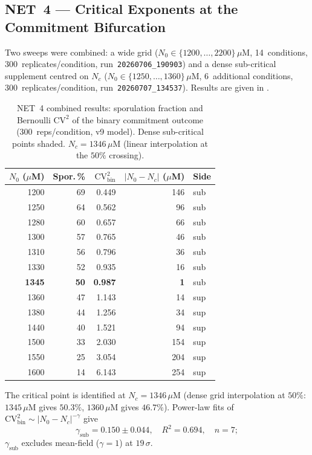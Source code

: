 \documentclass[11pt,a4paper]{article}
\newcommand{\CV}{\mathrm{CV}}
\begin{document}
\subsection{NET~4 --- Critical Exponents at the Commitment Bifurcation}
\label{ssec:t4}

Two sweeps were combined: a wide grid ($N_0 \in \{1200,\ldots,2200\}\,\mu$M,
14~conditions, 300~replicates/condition, run~\texttt{20260706\_190903}) and a
dense sub-critical supplement centred on $N_c$ ($N_0 \in \{1250,\ldots,1360\}\,
\mu$M, 6~additional conditions, 300~replicates/condition,
run~\texttt{20260707\_134537}).
Results are given in .

\begin{table}[h]
\centering
\caption{NET~4 combined results: sporulation fraction and Bernoulli $\CV^2$ of the
binary commitment outcome (300~reps/condition, v9 model).
Dense sub-critical points shaded.  $N_c = 1346\,\mu$M (linear interpolation at
the $50\%$ crossing).}
\label{tab:t4}
{\small\begin{tabular}{rrrrl}
\toprule
$N_0$ ($\mu$M) & Spor.\,\% & $\CV^2_{\mathrm{bin}}$ & $|N_0-N_c|$ ($\mu$M) & Side \\
\midrule
1200 & 69 & 0.449 & 146 & sub \\
\rowcolor{gray!15} 1250 & 64 & 0.562 &  96 & sub \\
\rowcolor{gray!15} 1280 & 60 & 0.657 &  66 & sub \\
1300 & 57 & 0.765 &  46 & sub \\
\rowcolor{gray!15} 1310 & 56 & 0.796 &  36 & sub \\
\rowcolor{gray!15} 1330 & 52 & 0.935 &  16 & sub \\
\rowcolor{gray!15} \textbf{1345} & \textbf{50} & \textbf{0.987} & \textbf{1} & sub \\
\rowcolor{gray!15} 1360 & 47 & 1.143 &  14 & sup \\
1380 & 44 & 1.256 &  34 & sup \\
1440 & 40 & 1.521 &  94 & sup \\
1500 & 33 & 2.030 & 154 & sup \\
1550 & 25 & 3.054 & 204 & sup \\
1600 & 14 & 6.143 & 254 & sup \\
\bottomrule
\end{tabular}}
\end{table}

The critical point is identified at $N_c = 1346\,\mu$M (dense grid interpolation
at $50\%$: $1345\,\mu$M gives $50.3\%$, $1360\,\mu$M gives $46.7\%$).
Power-law fits of $\CV^2_{\mathrm{bin}} \sim |N_0 - N_c|^{-\gamma}$ give
\begin{equation}
  \gamma_{\mathrm{sub}} = 0.150 \pm 0.044,\quad R^2 = 0.694,\quad n=7;
  \label{eq:gamma-v9}
\end{equation}
$\gamma_{\mathrm{sub}}$ excludes mean-field (\(\gamma = 1\)) at $19\,\sigma$.
\end{document}
